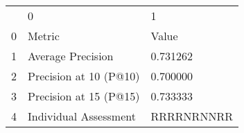 \begin{tabular}{lll}
 & 0 & 1 \\
0 & Metric & Value \\
1 & Average Precision & 0.731262 \\
2 & Precision at 10 (P@10) & 0.700000 \\
3 & Precision at 15 (P@15) & 0.733333 \\
4 & Individual Assessment & RRRRNRNNRR \\
\end{tabular}
